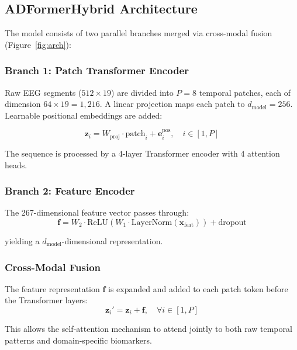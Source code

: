 \documentclass[twocolumn,11pt]{article}
\begin{document}
\subsection{ADFormerHybrid Architecture}

The model consists of two parallel branches merged via cross-modal fusion (Figure~\ref{fig:arch}):

\subsubsection{Branch 1: Patch Transformer Encoder}

Raw EEG segments ($512 \times 19$) are divided into $P = 8$ temporal patches, each of dimension $64 \times 19 = 1{,}216$. A linear projection maps each patch to $d_{\text{model}} = 256$. Learnable positional embeddings are added:

\begin{equation}
  \mathbf{z}_i = W_{\text{proj}} \cdot \text{patch}_i + \mathbf{e}_i^{\text{pos}}, \quad i \in [1, P]
\end{equation}

The sequence is processed by a 4-layer Transformer encoder with 4 attention heads.

\subsubsection{Branch 2: Feature Encoder}

The 267-dimensional feature vector passes through:
\begin{equation}
  \mathbf{f} = W_2 \cdot \text{ReLU}(W_1 \cdot \text{LayerNorm}(\mathbf{x}_{\text{feat}})) + \text{dropout}
\end{equation}

yielding a $d_{\text{model}}$-dimensional representation.

\subsubsection{Cross-Modal Fusion}

The feature representation $\mathbf{f}$ is expanded and added to each patch token before the Transformer layers:
\begin{equation}
  \mathbf{z}_i' = \mathbf{z}_i + \mathbf{f}, \quad \forall i \in [1, P]
\end{equation}

This allows the self-attention mechanism to attend jointly to both raw temporal patterns and domain-specific biomarkers.
\end{document}
